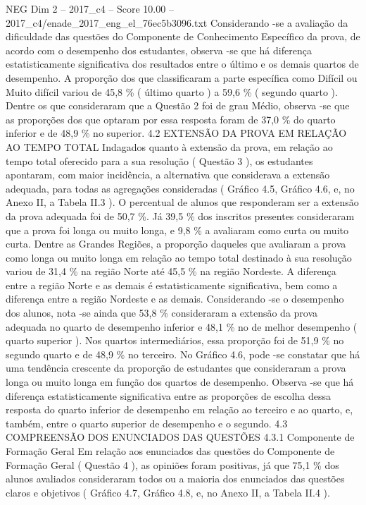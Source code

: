 \begin{textsample}{NEG Dim 2 – 2017\_c4 – Score 10.00 – 2017\_c4/enade\_2017\_eng\_el\_76ec5b3096.txt}
Considerando -se a avaliação da dificuldade das questões do Componente de Conhecimento Específico da prova, de acordo com o desempenho dos estudantes, observa -se que há diferença estatisticamente significativa dos resultados entre o último e os demais quartos de desempenho.
A proporção dos que classificaram a parte específica como Difícil ou Muito difícil variou de 45,8 \% ( último quarto ) a 59,6 \% ( segundo quarto ).
Dentre os que consideraram que a Questão 2 foi de grau Médio, observa -se que as proporções dos que optaram por essa resposta foram de 37,0 \% do quarto inferior e de 48,9 \% no superior. 4.2 EXTENSÃO DA PROVA EM RELAÇÃO AO TEMPO TOTAL Indagados quanto à extensão da prova, em relação ao tempo total oferecido para a sua resolução ( Questão 3 ), os estudantes apontaram, com maior incidência, a alternativa que considerava a extensão adequada, para todas as agregações consideradas ( Gráfico 4.5, Gráfico 4.6, e, no Anexo II, a Tabela II.3 ).
O percentual de alunos que responderam ser a extensão da prova adequada foi de 50,7 \%.
Já 39,5 \% dos inscritos presentes consideraram que a prova foi longa ou muito longa, e 9,8 \% a avaliaram como curta ou muito curta.
Dentre as Grandes Regiões, a proporção daqueles que avaliaram a prova como longa ou muito longa em relação ao tempo total destinado à sua resolução variou de 31,4 \% na região Norte até 45,5 \% na região Nordeste.
A diferença entre a região Norte e as demais é estatisticamente significativa, bem como a diferença entre a região Nordeste e as demais.
Considerando -se o desempenho dos alunos, nota -se ainda que 53,8 \% consideraram a extensão da prova adequada no quarto de desempenho inferior e 48,1 \% no de melhor desempenho ( quarto superior ).
Nos quartos intermediários, essa proporção foi de 51,9 \% no segundo quarto e de 48,9 \% no terceiro.
No Gráfico 4.6, pode -se constatar que há uma tendência crescente da proporção de estudantes que consideraram a prova longa ou muito longa em função dos quartos de desempenho.
Observa -se que há diferença estatisticamente significativa entre as proporções de escolha dessa resposta do quarto inferior de desempenho em relação ao terceiro e ao quarto, e, também, entre o quarto superior de desempenho e o segundo. 4.3 COMPREENSÃO DOS ENUNCIADOS DAS QUESTÕES 4.3.1 Componente de Formação Geral Em relação aos enunciados das questões do Componente de Formação Geral ( Questão 4 ), as opiniões foram positivas, já que 75,1 \% dos alunos avaliados consideraram todos ou a maioria dos enunciados das questões claros e objetivos ( Gráfico 4.7, Gráfico 4.8, e, no Anexo II, a Tabela II.4 ).

\end{textsample}
